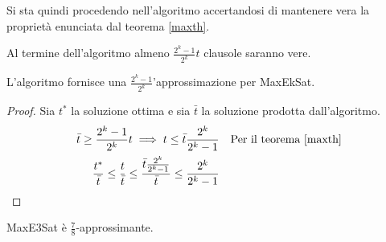 Si sta quindi procedendo nell'algoritmo accertandosi di mantenere vera la proprietà enunciata dal teorema \ref{maxth}.
\begin{theorem}
    Al termine dell'algoritmo almeno $\frac{2^k -1}{2^k}t$ clausole saranno vere.
\end{theorem}
\begin{corollary}
    L'algoritmo fornisce una $\frac{2^k -1}{2^k}$'approssimazione per MaxEkSat.
\end{corollary}
\begin{proof}
    Sia $t^*$ la soluzione ottima e sia $\bar{t}$ la soluzione prodotta dall'algoritmo.
    \begin{equation}
        \begin{aligned}
            \bar{t} \geq \frac{2^k -1}{2^k}t \implies t \leq \bar{t}\frac{2^k}{2^k -1} &&\text{Per il teorema \ref{maxth}}\\
            \frac{t^*}{\bar{t}} \leq \frac{t}{\bar{t}} \leq \frac{\bar{t}\frac{2^k}{2^k -1}}{\bar{t}} \leq \frac{2^k}{2^k -1}
        \end{aligned}
    \end{equation}
\end{proof}
\begin{corollary}
    MaxE3Sat è $\frac{7}{8}$-approssimante.
\end{corollary}